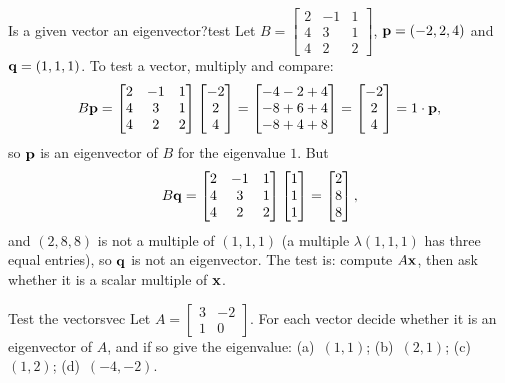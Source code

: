 \documentclass[11pt]{article}
\begin{document}
\begin{exmp}{Is a given vector an eigenvector?}{test}
Let $B=\begin{bmatrix}2&-1&1\\4&3&1\\4&2&2\end{bmatrix}$, $\mathbf{p}=(-2,2,4)$ and $\mathbf{q}=(1,1,1)$. To test a vector, multiply and compare:
\[
B\mathbf{p}=\begin{bmatrix}2&-1&1\\4&3&1\\4&2&2\end{bmatrix}\begin{bmatrix}-2\\2\\4\end{bmatrix}=\begin{bmatrix}-4-2+4\\-8+6+4\\-8+4+8\end{bmatrix}=\begin{bmatrix}-2\\2\\4\end{bmatrix}=1\cdot\mathbf{p},
\]
so $\mathbf{p}$ is an eigenvector of $B$ for the eigenvalue $1$. But
\[
B\mathbf{q}=\begin{bmatrix}2&-1&1\\4&3&1\\4&2&2\end{bmatrix}\begin{bmatrix}1\\1\\1\end{bmatrix}=\begin{bmatrix}2\\8\\8\end{bmatrix},
\]
and $(2,8,8)$ is not a multiple of $(1,1,1)$ (a multiple $\lambda(1,1,1)$ has three equal entries), so $\mathbf{q}$ is not an eigenvector. The test is: compute $A\mathbf{x}$, then ask whether it is a scalar multiple of $\mathbf{x}$.
\end{exmp}

\begin{kc}{Test the vectors}{vec}
Let $A=\begin{bmatrix}3&-2\\1&0\end{bmatrix}$. For each vector decide whether it is an eigenvector of $A$, and if so give the eigenvalue: (a)~$(1,1)$; (b)~$(2,1)$; (c)~$(1,2)$; (d)~$(-4,-2)$.
\end{kc}
\end{document}
